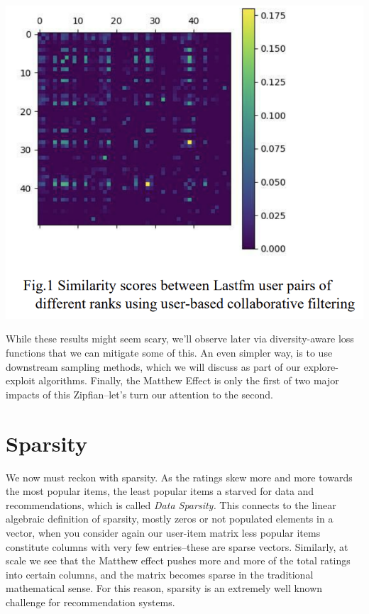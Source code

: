\vspace{10pt}
\includegraphics[width=\textwidth-10pt]{book-text/lastfm-matthew-effect.png}

While these results might seem scary, we'll observe later via diversity-aware loss functions that we can mitigate some of this. An even simpler way, is to use downstream sampling methods, which we will discuss as part of our explore-exploit algorithms. Finally, the Matthew Effect is only the first of two major impacts of this Zipfian–let's turn our attention to the second.


\section{Sparsity}

We now must reckon with sparsity. As the ratings skew more and more towards the most popular items, the least popular items a starved for data and recommendations, which is called \emph{Data Sparsity.} This connects to the linear algebraic definition of sparsity, mostly zeros or not populated elements in a vector, when you consider again our user-item matrix less popular items constitute columns with very few entries–these are sparse vectors. Similarly, at scale we see that the Matthew effect pushes more and more of the total ratings into certain columns, and the matrix becomes sparse in the traditional mathematical sense. For this reason, sparsity is an extremely well known challenge for recommendation systems. 

